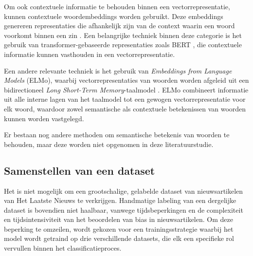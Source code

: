 Om ook contextuele informatie te behouden binnen een vectorrepresentatie, kunnen contextuele woordembeddings worden gebruikt. Deze embeddings genereren representaties die afhankelijk zijn van de context waarin een woord voorkomt binnen een zin \autocite{Akbik2018}. Een belangrijke techniek binnen deze categorie is het gebruik van transformer-gebaseerde representaties zoals BERT \autocite{Khodake2020}, die contextuele informatie kunnen vasthouden in een vectorrepresentatie.

Een andere relevante techniek is het gebruik van \textit{Embeddings from Language Models} (ELMo), waarbij vectorrepresentaties van woorden worden afgeleid uit een bidirectioneel \textit{Long Short-Term Memory}-taalmodel \autocite{Peters2018}. ELMo combineert informatie uit alle interne lagen van het taalmodel tot een gewogen vectorrepresentatie voor elk woord, waardoor zowel semantische als contextuele betekenissen van woorden kunnen worden vastgelegd.

Er bestaan nog andere methoden om semantische betekenis van woorden te behouden, maar deze worden niet opgenomen in deze literatuurstudie.

\subsection{Samenstellen van een dataset}

Het is niet mogelijk om een grootschalige, gelabelde dataset van nieuwsartikelen van Het Laatste Nieuws te verkrijgen. Handmatige labeling van een dergelijke dataset is bovendien niet haalbaar, vanwege tijdsbeperkingen en de complexiteit en tijdsintensiviteit van het beoordelen van bias in nieuwsartikelen. Om deze beperking te omzeilen, wordt gekozen voor een trainingsstrategie waarbij het model wordt getraind op drie verschillende datasets, die elk een specifieke rol vervullen binnen het classificatieproces.

